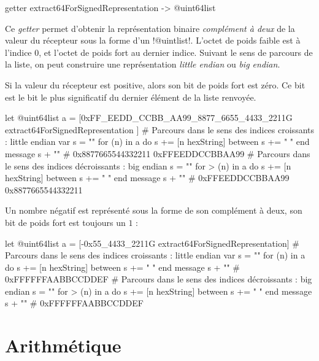 
\begin{galgasbox}
getter extract64ForSignedRepresentation -> @uint64list
\end{galgasbox}

Ce \emph{getter} permet d'obtenir la représentation binaire \emph{complément à deux} de la valeur du récepteur sous la forme d'un \ggs!@uintlist!. L'octet de poids faible est à l'indice $0$, et l'octet de poids fort au dernier indice. Suivant le sens de parcours de la liste, on peut construire une représentation \emph{little endian} ou \emph{big endian}.

Si la valeur du récepteur est positive, alors son bit de poids fort est zéro. Ce bit est le bit le plus significatif du dernier élément de la liste renvoyée.

\begin{galgas}
let @uint64list a = [0xFF_EEDD_CCBB_AA99_8877_6655_4433_2211G
  extract64ForSignedRepresentation
]
# Parcours dans le sens des indices croissants : little endian
var s = ""
for (n) in a
  do s += [n hexString]
  between s += " "
end
message s + "\n" # 0x8877665544332211 0xFFEEDDCCBBAA99
# Parcours dans le sens des indices décroissants : big endian
s = ""
for > (n) in a
  do s += [n hexString]
  between s += " "
end
message s + "\n" # 0xFFEEDDCCBBAA99 0x8877665544332211
\end{galgas}

Un nombre négatif est représenté sous la forme de son complément à deux, son bit de poids fort est toujours un $1$ : 

\begin{galgas}
let @uint64list a = [-0x55_4433_2211G extract64ForSignedRepresentation]
# Parcours dans le sens des indices croissants : little endian
var s = ""
for (n) in a
  do s += [n hexString]
  between s += " "
end
message s + "\n" # 0xFFFFFFAABBCCDDEF
# Parcours dans le sens des indices décroissants : big endian
s = ""
for > (n) in a
  do s += [n hexString]
  between s += " "
end
message s + "\n" # 0xFFFFFFAABBCCDDEF
\end{galgas}














\section{Arithmétique}


